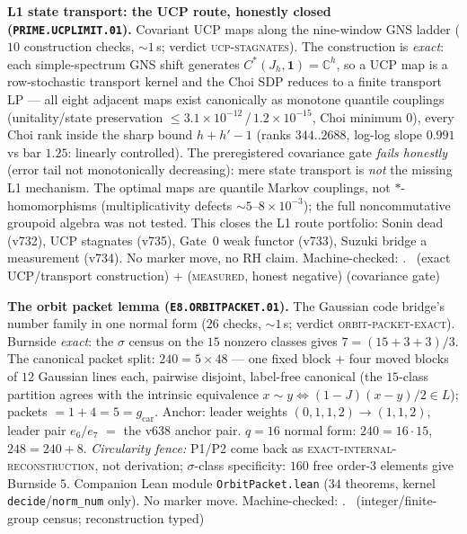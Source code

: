 \documentclass[11pt,a4paper]{article}
\theoremstyle{definition}
\begin{document}
\par\smallskip\noindent\textbf{L1 state transport: the UCP route,
honestly closed (\texttt{PRIME.UCPLIMIT.01}).}
Covariant UCP maps along the nine-window GNS ladder ($10$
construction checks, ${\sim}1$\,s; verdict \textsc{ucp-stagnates}).
The construction is \emph{exact}: each simple-spectrum GNS shift
generates $C^*(J_h,\mathbf 1)=\mathbb C^h$, so a UCP map is a
row-stochastic transport kernel and the Choi SDP reduces to a finite
transport LP --- all eight adjacent maps exist canonically as
monotone quantile couplings (unitality/state preservation
$\le3.1\times10^{-12}$\,/\,$1.2\times10^{-15}$, Choi minimum $0$),
every Choi rank inside the sharp bound $h+h'-1$ (ranks $344..2688$,
log-log slope $0.991$ vs bar $1.25$: linearly controlled).  The
preregistered covariance gate \emph{fails honestly} (error tail not
monotonically decreasing): mere state transport is \emph{not} the
missing L1 mechanism.  The optimal maps are quantile Markov
couplings, not $*$-homomorphisms (multiplicativity defects
${\sim}5$--$8\times10^{-3}$); the full noncommutative groupoid
algebra was not tested.  This closes the L1 route portfolio: Sonin
dead (v732), UCP stagnates (v735), Gate~0 weak functor (v733),
Suzuki bridge a measurement (v734).  No marker move, no RH claim.
Machine-checked: .
\mE\ (exact UCP/transport construction) $+$ (\textsc{measured},
honest negative) (covariance gate)
\par\smallskip

\par\smallskip\noindent\textbf{The orbit packet lemma
(\texttt{E8.ORBITPACKET.01}).}
The Gaussian code bridge's number family in one normal form ($26$
checks, ${\sim}1$\,s; verdict \textsc{orbit-packet-exact}).
Burnside \emph{exact}: the $\sigma$ census on the $15$ nonzero
classes gives $7=(15+3+3)/3$.  The canonical packet split:
$240=5\times48$ --- one fixed block $+$ four moved blocks of $12$
Gaussian lines each, pairwise disjoint, label-free canonical (the
$15$-class partition agrees with the intrinsic equivalence
$x\sim y\iff(1-J)(x-y)/2\in L$); packets $=1+4=5=g_{\mathrm{car}}$.
Anchor: leader weights $(0,1,1,2)\to(1,1,2)$, leader pair $e_6/e_7$
$=$ the v638 anchor pair.  $q=16$ normal form: $240=16\cdot15$,
$248=240+8$.  \emph{Circularity fence:} P1/P2 come back as
\textsc{exact-internal-reconstruction}, not derivation;
$\sigma$-class specificity: $160$ free order-$3$ elements give
Burnside $5$.  Companion Lean module \texttt{OrbitPacket.lean}
($34$ theorems, kernel \texttt{decide}/\texttt{norm\_num} only).
No marker move.
Machine-checked: .
\mE\ (integer/finite-group census; reconstruction typed)
\par\smallskip
\end{document}
